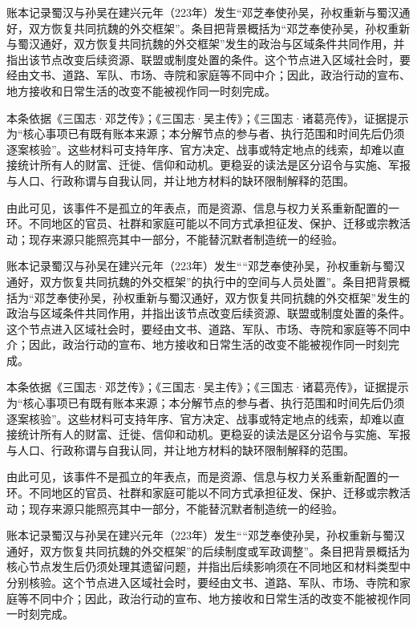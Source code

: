 账本记录蜀汉与孙吴在建兴元年（223年）发生“邓芝奉使孙吴，孙权重新与蜀汉通好，双方恢复共同抗魏的外交框架”。条目把背景概括为“邓芝奉使孙吴，孙权重新与蜀汉通好，双方恢复共同抗魏的外交框架”发生的政治与区域条件共同作用，并指出该节点改变后续资源、联盟或制度处置的条件。这个节点进入区域社会时，要经由文书、道路、军队、市场、寺院和家庭等不同中介；因此，政治行动的宣布、地方接收和日常生活的改变不能被视作同一时刻完成。

本条依据《三国志·邓芝传》；《三国志·吴主传》；《三国志·诸葛亮传》，证据提示为“核心事项已有既有账本来源；本分解节点的参与者、执行范围和时间先后仍须逐案核验”。这些材料可支持年序、官方决定、战事或特定地点的线索，却难以直接统计所有人的财富、迁徙、信仰和动机。更稳妥的读法是区分诏令与实施、军报与人口、行政称谓与自我认同，并让地方材料的缺环限制解释的范围。

由此可见，该事件不是孤立的年表点，而是资源、信息与权力关系重新配置的一环。不同地区的官员、社群和家庭可能以不同方式承担征发、保护、迁移或宗教活动；现存来源只能照亮其中一部分，不能替沉默者制造统一的经验。

账本记录蜀汉与孙吴在建兴元年（223年）发生““邓芝奉使孙吴，孙权重新与蜀汉通好，双方恢复共同抗魏的外交框架”的执行中的空间与人员处置”。条目把背景概括为“邓芝奉使孙吴，孙权重新与蜀汉通好，双方恢复共同抗魏的外交框架”发生的政治与区域条件共同作用，并指出该节点改变后续资源、联盟或制度处置的条件。这个节点进入区域社会时，要经由文书、道路、军队、市场、寺院和家庭等不同中介；因此，政治行动的宣布、地方接收和日常生活的改变不能被视作同一时刻完成。

本条依据《三国志·邓芝传》；《三国志·吴主传》；《三国志·诸葛亮传》，证据提示为“核心事项已有既有账本来源；本分解节点的参与者、执行范围和时间先后仍须逐案核验”。这些材料可支持年序、官方决定、战事或特定地点的线索，却难以直接统计所有人的财富、迁徙、信仰和动机。更稳妥的读法是区分诏令与实施、军报与人口、行政称谓与自我认同，并让地方材料的缺环限制解释的范围。

由此可见，该事件不是孤立的年表点，而是资源、信息与权力关系重新配置的一环。不同地区的官员、社群和家庭可能以不同方式承担征发、保护、迁移或宗教活动；现存来源只能照亮其中一部分，不能替沉默者制造统一的经验。

账本记录蜀汉与孙吴在建兴元年（223年）发生““邓芝奉使孙吴，孙权重新与蜀汉通好，双方恢复共同抗魏的外交框架”的后续制度或军政调整”。条目把背景概括为核心节点发生后仍须处理其遗留问题，并指出后续影响须在不同地区和材料类型中分别核验。这个节点进入区域社会时，要经由文书、道路、军队、市场、寺院和家庭等不同中介；因此，政治行动的宣布、地方接收和日常生活的改变不能被视作同一时刻完成。


